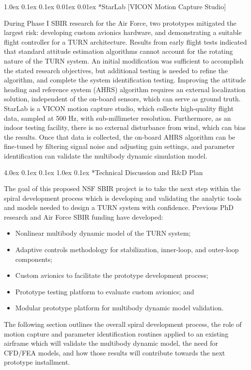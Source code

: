 \documentclass[11pt]{article}
\makeatletter
\renewcommand\section{
\@startsection{section}{1}{\z@}%
{4.0ex \@plus 0.1ex \@minus 0.1ex}%
{1.0ex \@plus 0.1ex}%
{\normalfont\LARGE\bfseries}}
\renewcommand\subsection{
\@startsection{subsection}{2}{\z@}%
{1.0ex \@plus 0.1ex \@minus 0.1ex}%
{0.01ex \@plus 0.01ex}%
{\normalfont\Large\bfseries}}
\makeatother
\begin{document}
\subsection*{StarLab [VICON Motion Capture Studio]}

During Phase I SBIR research for the Air Force, two prototypes mitigated the largest risk: developing custom avionics hardware, and demonstrating a suitable flight controller for a TURN architecture.  Results from early flight tests indicated that standard attitude estimation algorithms cannot account for the rotating nature of the TURN system.  An initial modification was sufficient to accomplish the stated research objectives, but additional testing is needed to refine the algorithm, and complete the system identification testing.  Improving the attitude heading and reference system (AHRS) algorithm requires an external localization solution, independent of the on-board sensors, which can serve as ground truth.  StarLab is a VICON motion capture studio, which collects high-quality flight data, sampled at 500 Hz, with sub-millimeter resolution.  Furthermore, as an indoor testing facility, there is no external disturbance from wind, which can bias the results.  Once that data is collected, the on-board AHRS algorithm can be fine-tuned by filtering signal noise and adjusting gain settings, and parameter identification can validate the multibody dynamic simulation model.








\section*{Technical Discussion and R\&D Plan}

The goal of this proposed NSF SBIR project is to take the next step within the spiral development process which is developing and validating the analytic tools and models needed to design a TURN system with confidence.  Previous PhD research and Air Force SBIR funding have developed:
\begin{itemize}
\item Nonlinear multibody dynamic model of the TURN system;
\item Adaptive controls methodology for stabilization, inner-loop, and outer-loop components;
\item Custom avionics to facilitate the prototype development process;
\item Prototype testing platform to evaluate custom avionics; and
\item Modular prototype platform for multibody dynamic model validation.
\end{itemize}
The following section outlines the overall spiral development process, the role of motion capture and parameter identification routines applied to an existing airframe which will validate the multibody dynamic model, the need for CFD/FEA models, and how those results will contribute towards the next prototype installment.
\end{document}
